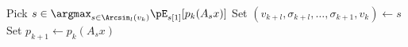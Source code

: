 \begin{algorithm}[!ht]
  \caption{Generates a sequence of large asymptotic growth using paths of length $l$.}
  \label{algo:prodl}
  \begin{algorithmic}
    \STATE Pick $s \in \argmax_{s \in \Arcsin_l(v_{k})} \pE_{s[1]}[p_k(A_s x)]$
    \STATE Set $(v_{k+l},\sigma_{k+l},\ldots,\sigma_{k+1},v_k) \leftarrow s$
    \STATE Set $p_{k+1} \leftarrow p_k(A_s x)$
    \ENDFOR
  \end{algorithmic}
\end{algorithm}
